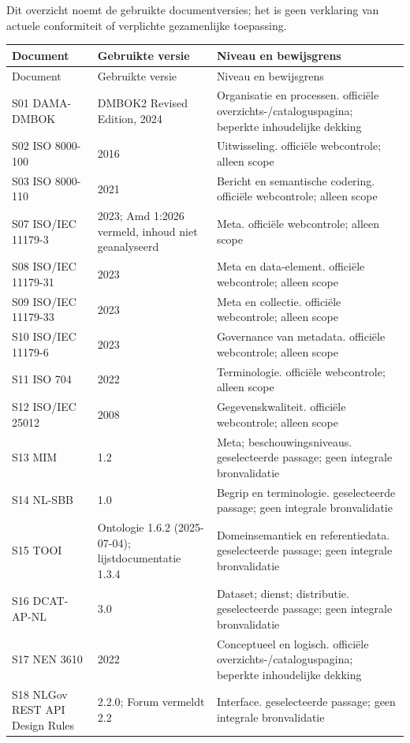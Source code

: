 Dit overzicht noemt de gebruikte documentversies; het is geen verklaring van actuele conformiteit of verplichte gezamenlijke toepassing.
\small\begin{longtable}{@{}P{.29\linewidth}P{.22\linewidth}P{.41\linewidth}@{}}
\toprule Document & Gebruikte versie & Niveau en bewijsgrens \\\midrule\endfirsthead
\toprule Document & Gebruikte versie & Niveau en bewijsgrens \\\midrule\endhead
S01 DAMA-DMBOK & DMBOK2 Revised Edition, 2024 & Organisatie en processen. officiële overzichts-/cataloguspagina; beperkte inhoudelijke dekking \\
S02 ISO 8000-100 & 2016 & Uitwisseling. officiële webcontrole; alleen scope \\
S03 ISO 8000-110 & 2021 & Bericht en semantische codering. officiële webcontrole; alleen scope \\
S07 ISO/IEC 11179-3 & 2023; Amd 1:2026 vermeld, inhoud niet geanalyseerd & Meta. officiële webcontrole; alleen scope \\
S08 ISO/IEC 11179-31 & 2023 & Meta en data-element. officiële webcontrole; alleen scope \\
S09 ISO/IEC 11179-33 & 2023 & Meta en collectie. officiële webcontrole; alleen scope \\
S10 ISO/IEC 11179-6 & 2023 & Governance van metadata. officiële webcontrole; alleen scope \\
S11 ISO 704 & 2022 & Terminologie. officiële webcontrole; alleen scope \\
S12 ISO/IEC 25012 & 2008 & Gegevenskwaliteit. officiële webcontrole; alleen scope \\
S13 MIM & 1.2 & Meta; beschouwingsniveaus. geselecteerde passage; geen integrale bronvalidatie \\
S14 NL-SBB & 1.0 & Begrip en terminologie. geselecteerde passage; geen integrale bronvalidatie \\
S15 TOOI & Ontologie 1.6.2 (2025-07-04); lijstdocumentatie 1.3.4 & Domeinsemantiek en referentiedata. geselecteerde passage; geen integrale bronvalidatie \\
S16 DCAT-AP-NL & 3.0 & Dataset; dienst; distributie. geselecteerde passage; geen integrale bronvalidatie \\
S17 NEN 3610 & 2022 & Conceptueel en logisch. officiële overzichts-/cataloguspagina; beperkte inhoudelijke dekking \\
S18 NLGov REST API Design Rules & 2.2.0; Forum vermeldt 2.2 & Interface. geselecteerde passage; geen integrale bronvalidatie \\

\end{longtable}
